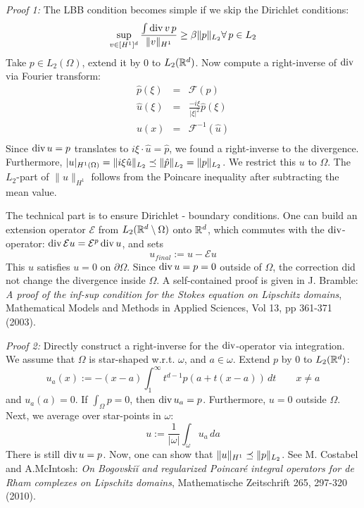 {\em Proof 1: } The LBB condition becomes simple if we skip the Dirichlet conditions:
$$
\sup_{v \in [H^1]^d} \frac { \int \operatorname{div} v \, p}  { \| v \|_{H^1}} \geq \beta \| p \|_{L_2}
\forall \, p \in L_2
$$
Take $p \in L_2(\Omega)$, extend it by $0$ to $L_2 ({\mathbb R}^d)$. Now compute a right-inverse of $\operatorname{div}$ via Fourier transform:
\begin{eqnarray*}
\hat p(\xi) & = & {\mathcal F} (p) \\
\hat u(\xi) & = & \frac{-i\xi}{|\xi|^2} \hat p(\xi) \\
u(x) & = & {\mathcal F}^{-1} (\hat u ) \\
\end{eqnarray*}
Since $\operatorname{div} u = p$ translates to $i \xi \cdot \hat u = \hat p$, we
found a right-inverse to the divergence. Furthermore, $| u
|_{H^1(\Omega)} = \| i \xi \hat u\|_{L_2} \preceq \| \hat p \|_{L_2} =
\| p \|_{L_2}$. We restrict this $u$ to $\Omega$. 
The $L_2$-part of $\| u \|_{H^1}$ follows from the
Poincare inequality after subtracting the mean value. 

The technical part is to ensure Dirichlet - boundary conditions. One can build an extension operator ${\mathcal E}$ from $L_2({\mathbb R}^d \setminus \Omega)$ onto ${\mathbb R}^d$, which commutes with the $\operatorname{div}$-operator: $\operatorname{div} {\mathcal E} u = {\mathcal E}^p \operatorname{div} u$, and sets
$$
u_{final} := u - {\mathcal E} u
$$
This $u$ satisfies $u = 0$ on $\partial \Omega$. Since $\operatorname{div} u = p =
0$ outside of $\Omega$, the correction did not change the divergence
inside $\Omega$.
A self-contained  proof is given in J. Bramble: {\em A proof of the
  inf-sup condition for the Stokes equation on Lipschitz domains},
Mathematical Models and Methods in Applied Sciences, Vol 13, pp
361-371 (2003).

{\em Proof 2: } Directly construct a right-inverse for the $\operatorname{div}$-operator via integration. We assume that $\Omega$ is star-shaped w.r.t. $\omega$, and $a\in \omega$. Extend $p$ by $0$ to $L_2({\mathbb R}^d)$:
$$
u_a(x) := -(x-a) \int_1^\infty  t^{d-1} p(a + t(x-a)) \, dt\qquad x
\neq a
$$
and $u_a(a) = 0$.
If $\int_\Omega p = 0$, then $\operatorname{div} u_a = p$. Furthermore, $u = 0$ outside $\Omega$.
Next, we average over star-points in $\omega$:
$$
u := \frac{1}{|\omega|}  \int_\omega u_a \, da
$$
There is still $\operatorname{div} u = p$. Now, one can show that $\| u \|_{H^1}
\preceq \| p \|_{L_2}$. See M. Costabel and A.McIntosh: {\em On
  Bogovski\u{i} and regularized Poincar\'e integral operators for de Rham
  complexes
  on Lipschitz domains}, Mathematische Zeitschrift 265, 297-320 (2010).


